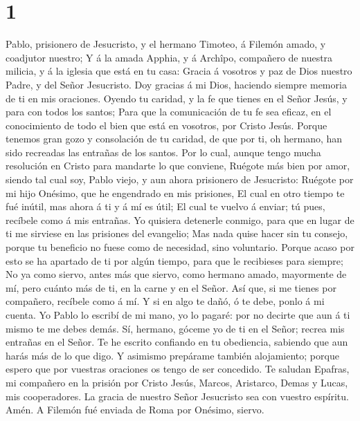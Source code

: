 \hypertarget{section}{%
\section{1}\label{section}}

 Pablo, prisionero de Jesucristo, y el hermano Timoteo, á
Filemón amado, y coadjutor nuestro;  Y á la amada Apphia, y
á Archîpo, compañero de nuestra milicia, y á la iglesia que está en tu
casa:  Gracia á vosotros y paz de Dios nuestro Padre, y del
Señor Jesucristo.  Doy gracias á mi Dios, haciendo siempre
memoria de ti en mis oraciones.  Oyendo tu caridad, y la fe
que tienes en el Señor Jesús, y para con todos los santos; 
Para que la comunicación de tu fe sea eficaz, en el conocimiento de todo
el bien que está en vosotros, por Cristo Jesús.  Porque
tenemos gran gozo y consolación de tu caridad, de que por ti, oh
hermano, han sido recreadas las entrañas de los santos.  Por
lo cual, aunque tengo mucha resolución en Cristo para mandarte lo que
conviene,  Ruégote más bien por amor, siendo tal cual soy,
Pablo viejo, y aun ahora prisionero de Jesucristo:  Ruégote
por mi hijo Onésimo, que he engendrado en mis prisiones, 
El cual en otro tiempo te fué inútil, mas ahora á ti y á mí es útil;
 El cual te vuelvo á enviar; tú pues, recíbele como á mis
entrañas.  Yo quisiera detenerle conmigo, para que en lugar
de ti me sirviese en las prisiones del evangelio;  Mas nada
quise hacer sin tu consejo, porque tu beneficio no fuese como de
necesidad, sino voluntario.  Porque acaso por esto se ha
apartado de ti por algún tiempo, para que le recibieses para siempre;
 No ya como siervo, antes más que siervo, como hermano
amado, mayormente de mí, pero cuánto más de ti, en la carne y en el
Señor.  Así que, si me tienes por compañero, recíbele como
á mí.  Y si en algo te dañó, ó te debe, ponlo á mi cuenta.
 Yo Pablo lo escribí de mi mano, yo lo pagaré: por no
decirte que aun á ti mismo te me debes demás.  Sí, hermano,
góceme yo de ti en el Señor; recrea mis entrañas en el Señor.
 Te he escrito confiando en tu obediencia, sabiendo que aun
harás más de lo que digo.  Y asimismo prepárame también
alojamiento; porque espero que por vuestras oraciones os tengo de ser
concedido.  Te saludan Epafras, mi compañero en la prisión
por Cristo Jesús,  Marcos, Aristarco, Demas y Lucas, mis
cooperadores.  La gracia de nuestro Señor Jesucristo sea
con vuestro espíritu. Amén. A Filemón fué enviada de Roma por Onésimo,
siervo.

